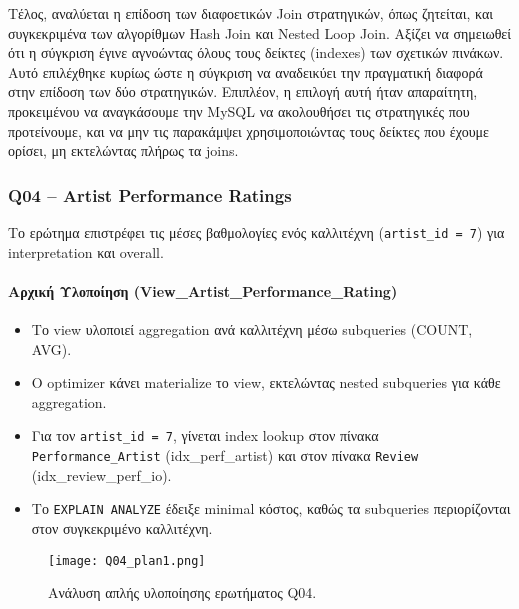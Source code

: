 \documentclass[13pt]{extarticle}
\begin{document}
Τέλος, αναλύεται η επίδοση των διαφοετικών Join στρατηγικών, όπως ζητείται, και συγκεκριμένα των αλγορίθμων Hash Join και Nested Loop Join. Αξίζει να σημειωθεί ότι η σύγκριση έγινε αγνοώντας όλους τους δείκτες (indexes) των σχετικών πινάκων. Αυτό επιλέχθηκε κυρίως ώστε η σύγκριση να αναδεικύει την πραγματική διαφορά στην επίδοση των δύο στρατηγικών. Επιπλέον, η επιλογή αυτή ήταν απαραίτητη, προκειμένου να αναγκάσουμε την MySQL να ακολουθήσει τις στρατηγικές που προτείνουμε, και να μην τις παρακάμψει χρησιμοποιώντας τους δείκτες που έχουμε ορίσει, μη εκτελώντας πλήρως τα joins.

\subsubsection{Q04 – Artist Performance Ratings}

Το ερώτημα επιστρέφει τις μέσες βαθμολογίες ενός καλλιτέχνη (\texttt{artist\_id = 7}) για interpretation και overall.

\paragraph{Αρχική Υλοποίηση (View\_Artist\_Performance\_Rating)}
\begin{itemize}
    \item Το view υλοποιεί aggregation ανά καλλιτέχνη μέσω subqueries (COUNT, AVG).
    \item Ο optimizer κάνει materialize το view, εκτελώντας nested subqueries για κάθε aggregation.
    \item Για τον \texttt{artist\_id = 7}, γίνεται index lookup στον πίνακα \texttt{Performance\_Artist} (idx\_perf\_artist) και στον πίνακα \texttt{Review} (idx\_review\_perf\_io).
    \item Το \texttt{EXPLAIN ANALYZE} έδειξε minimal κόστος, καθώς τα subqueries περιορίζονται στον συγκεκριμένο καλλιτέχνη.
\end{itemize}

\begin{figure}[H]
    \centering
    \texttt{[image: Q04\_plan1.png]}
    \caption{Ανάλυση απλής υλοποίησης ερωτήματος Q04.}
\end{figure}
\end{document}
